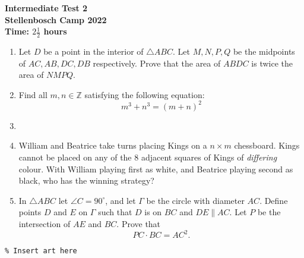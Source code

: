 \documentclass{article}
\begin{document}
\thispagestyle{empty}

\begin{center}
  \textbf{\Large Intermediate Test 2}
  \\ \vspace{1em}
  \textbf{\large Stellenbosch Camp 2022}
  \\ \vspace{1em}
  \textbf{\large Time: $2\frac{1}{2}$ hours}
\end{center}

\bigskip

\begin{enumerate}[itemsep=\fill]

\item %
Let $D$ be a point in the interior of $\triangle ABC$. Let $M,N,P,Q$ be the midpoints of $AC, AB, DC, DB$ respectively. Prove that the area of $ABDC$ is twice the area of $NMPQ$. 

\item %
Find all $m,n\in \mathbb{Z}$ satisfying the following equation:
\[m^3 + n^3 = (m+n)^2\]

\item %

\item %
William and Beatrice take turns placing Kings on a $n \times m$ chessboard.
Kings cannot be placed on any of the 8 adjacent squares of Kings of \emph{differing} colour.
With William playing first as white, and Beatrice playing second as black, who has the winning strategy?

\item %
In $\triangle ABC$ let $\angle C = 90^\circ$, and let $\Gamma$ be the circle with diameter $AC$.
Define points $D$ and $E$ on $\Gamma$ such that $D$ is on $BC$ and $DE \parallel AC$.
Let $P$ be the intersection of $AE$ and $BC$.
Prove that
\[ PC \cdot BC = AC^2. \]

\end{enumerate}


\vfill
\centering
\small
\begin{BVerbatim}
\end{BVerbatim}
\end{document}
